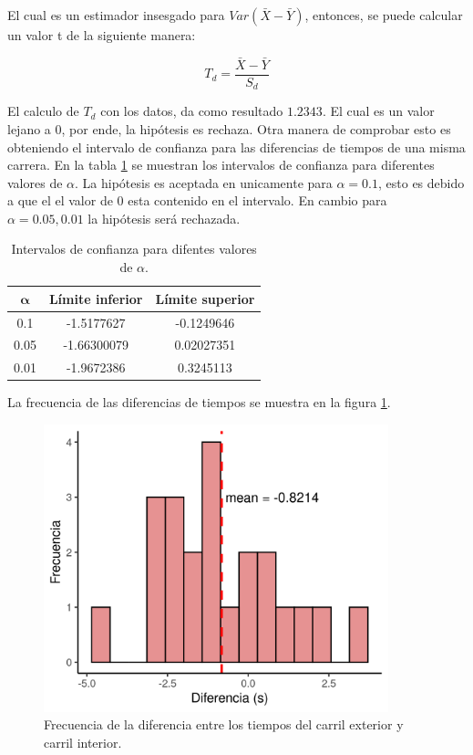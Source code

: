 El cual es un estimador insesgado para $Var(\bar{X}-\bar{Y})$, entonces, se puede calcular un valor t de la siguiente manera:

\begin{equation*}
	T_d = \frac{\bar{X}-\bar{Y}}{S_d}
\end{equation*}

El calculo de $T_d$ con los datos, da como resultado $1.2343$. El cual es un valor lejano a 0, por ende, la hipótesis es rechaza. Otra manera de comprobar esto es obteniendo el intervalo de confianza para las diferencias de tiempos de una misma carrera. En la tabla \ref{table:problema7_intervalo_de_confianza} se muestran los intervalos de confianza para diferentes valores de $\alpha$. La hipótesis es aceptada en unicamente para $\alpha = 0.1$, esto es debido a que el el valor de 0 esta contenido en el intervalo. En cambio para $\alpha=0.05,0.01$ la hipótesis será rechazada.

\begin{table}[H]
	\centering
	\begin{tabular}{ccc} \hline
		$\mathbf{\alpha}$ & \textbf{Límite inferior} & \textbf{Límite superior} \\ \hline
		0.1               & -1.5177627               & -0.1249646               \\
		0.05              & -1.66300079              & 0.02027351               \\
		0.01              & -1.9672386               & 0.3245113                \\ \hline
	\end{tabular}
	\caption{Intervalos de confianza para difentes valores de $\alpha$.}
	\label{table:problema7_intervalo_de_confianza}
\end{table}

La frecuencia de las diferencias de tiempos se muestra en la figura \ref{fig:problema07_histogram}.

\begin{figure}[H]
	\centering
	\includegraphics[width=10cm]{Graphics/problema07_histogram.png}
	\caption{Frecuencia de la diferencia entre los tiempos del carril exterior y carril interior.}
	\label{fig:problema07_histogram}
\end{figure}
